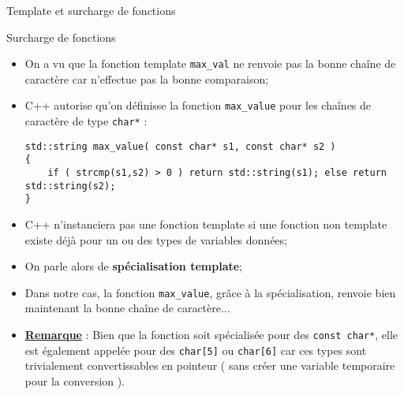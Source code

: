 \documentclass[handout,10pt]{beamer}
\begin{document}
\begin{frame}[fragile]{Template et surcharge de fonctions}
\tiny
\begin{block}{Surcharge de fonctions}
\begin{itemize}
\item On a vu que la fonction template \lstinline$max_val$ ne renvoie pas la bonne chaîne de caractère car n'effectue pas la bonne comparaison;
\item C++ autorise qu'on définisse la fonction \lstinline$max_value$ pour les chaînes de caractère de type \lstinline$char*$ :
\begin{lstlisting}
std::string max_value( const char* s1, const char* s2 )
{
    if ( strcmp(s1,s2) > 0 ) return std::string(s1); else return std::string(s2);
}
\end{lstlisting}
\item C++ n'instanciera pas une fonction template si une fonction non template existe déjà pour un ou des types de variables données;
\item On parle alors de {\bf\color{red}spécialisation template};
\item Dans notre cas, la fonction \lstinline$max_value$, grâce à la spécialisation, renvoie bien maintenant la bonne chaîne de caractère...
\item \textbf{\underline{Remarque}} : Bien que la fonction soit spécialisée pour des \lstinline$const char*$, elle est également appelée pour des \lstinline$char[5]$ ou \lstinline$char[6]$ car ces types sont trivialement convertissables en pointeur ( sans créer une variable temporaire pour la conversion ).
\end{itemize}
\end{block}
\end{frame}
\end{document}
